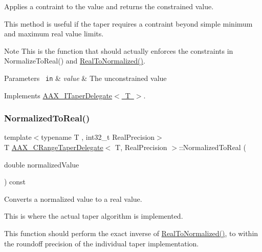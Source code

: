 Applies a contraint to the value and returns the constrained value. 

This method is useful if the taper requires a contraint beyond simple minimum and maximum real value limits.

\begin{DoxyNote}{Note}
This is the function that should actually enforces the constraints in Normalize\+To\+Real() and \mbox{\hyperlink{a01557_a457a42ac3e78debf4c595ac1afeec7cf}{Real\+To\+Normalized()}}.
\end{DoxyNote}

\begin{DoxyParams}[1]{Parameters}
\mbox{\texttt{ in}}  & {\em value} & The unconstrained value \\
\hline
\end{DoxyParams}


Implements \mbox{\hyperlink{a01881_a1de7acdc2b3e114b6686bf845c2465f1}{A\+A\+X\+\_\+\+I\+Taper\+Delegate$<$ T $>$}}.

\mbox{\label{a01557_a50b58efa795c9973ab199d4f5bb31de4}} 
\subsubsection{\texorpdfstring{NormalizedToReal()}{NormalizedToReal()}}
{\footnotesize\ttfamily template$<$typename T , int32\+\_\+t Real\+Precision$>$ \\
T \mbox{\hyperlink{a01557}{A\+A\+X\+\_\+\+C\+Range\+Taper\+Delegate}}$<$ T, Real\+Precision $>$\+::Normalized\+To\+Real (\begin{DoxyParamCaption}\item[{double}]{normalized\+Value }\end{DoxyParamCaption}) const\hspace{0.3cm}{\ttfamily [virtual]}}



Converts a normalized value to a real value. 

This is where the actual taper algorithm is implemented.

This function should perform the exact inverse of \mbox{\hyperlink{a01557_a457a42ac3e78debf4c595ac1afeec7cf}{Real\+To\+Normalized()}}, to within the roundoff precision of the individual taper implementation.


